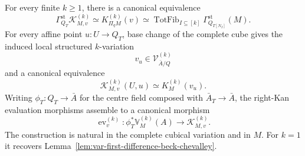 \begin{lemma}
\label{lem:var-k-difference-beck-chevalley}
For every finite \(k\ge1\), there is a canonical equivalence
\[
    \boxed{
    \Gamma_{Q_T}^{\mathrm{st}}
    \mathscr K^{(k)}_{M,v}
    \simeq
    K_{\Pi_qM}^{(k)}(v)
    \simeq
    \operatorname{TotFib}_{I\subseteq[k]}
    \Gamma_{Q_{T[N_I]}}^{\mathrm{st}}(M).
    }
\]
For every affine point \(u:U\to Q_T\), base change of the complete cube gives the induced local structured \(k\)-variation
\[
    v_u\in\mathcal V^{(k)}_{\bar A/Q}
\]
and a canonical equivalence
\[
    \boxed{
    \mathscr K^{(k)}_{M,v}(U,u)
    \simeq
    K_M^{(k)}(v_u).
    }
\]
Writing \(\phi_T:Q_T\to\bar A\) for the centre field composed with \(\bar A_T\to\bar A\), the right-Kan evaluation morphisms assemble to a canonical morphism
\[
    \boxed{
    \operatorname{ev}^{(k)}_v:
    \phi_T^*\mathbb V_M^{(k)}(A)
    \longrightarrow
    \mathscr K^{(k)}_{M,v}.
    }
\]
The construction is natural in the complete cubical variation and in \(M\). For \(k=1\) it recovers Lemma~\ref{lem:var-first-difference-beck-chevalley}.
\end{lemma}

